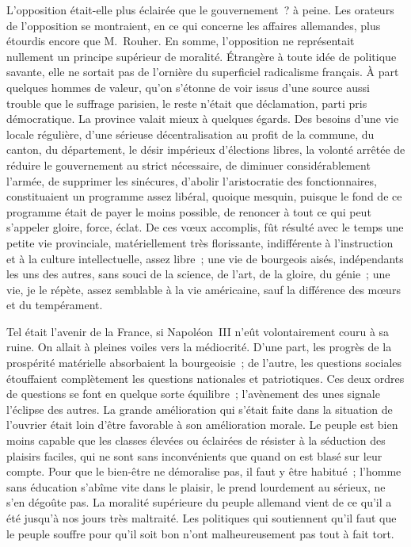 \documentclass[french,twoside]{book} %
\begin{document}
L’opposition était-elle plus éclairée que le gouvernement ? à peine. Les orateurs de l’opposition se montraient, en ce qui concerne les affaires allemandes, plus étourdis encore que M. Rouher. En somme, l’opposition ne représentait nullement un principe supérieur de moralité. Étrangère à toute idée de politique savante, elle ne sortait pas de l’ornière du superficiel radicalisme français. À part quelques hommes de valeur, qu’on s’étonne de voir issus d’une source aussi trouble que le suffrage parisien, le reste n’était que déclamation, parti pris démocratique. La province valait mieux à quelques égards. Des besoins d’une vie locale régulière, d’une sérieuse décentralisation au profit de la commune, du canton, du département, le désir impérieux d’élections libres, la volonté arrêtée de réduire le gouvernement au strict nécessaire, de diminuer considérablement l’armée, de supprimer les sinécures, d’abolir l’aristocratie des fonctionnaires, constituaient un programme assez libéral, quoique mesquin, puisque le fond de ce programme était de payer le moins possible, de renoncer à tout ce qui peut s’appeler gloire, force, éclat. De ces vœux accomplis, fût résulté avec le temps une petite vie provinciale, matériellement très florissante, indifférente à l’instruction et à la culture intellectuelle, assez libre ; une vie de bourgeois aisés, indépendants les uns des autres, sans souci de la science, de l’art, de la gloire, du génie ; une vie, je le répète, assez semblable à la vie américaine, sauf la différence des mœurs et du tempérament.\par
Tel était l’avenir de la France, si Napoléon III n’eût volontairement couru à sa ruine. On allait à pleines voiles vers la médiocrité. D’une part, les progrès de la prospérité matérielle absorbaient la bourgeoisie ; de l’autre, les questions sociales étouffaient complètement les questions nationales et patriotiques. Ces deux ordres de questions se font en quelque sorte équilibre ; l’avènement des unes signale l’éclipse des autres. La grande amélioration qui s’était faite dans la situation de l’ouvrier était loin d’être favorable à son amélioration morale. Le peuple est bien moins capable que les classes élevées ou éclairées de résister à la séduction des plaisirs faciles, qui ne sont sans inconvénients que quand on est blasé sur leur compte. Pour que le bien-être ne démoralise pas, il faut y être habitué ; l’homme sans éducation s’abîme vite dans le plaisir, le prend lourdement au sérieux, ne s’en dégoûte pas. La moralité supérieure du peuple allemand vient de ce qu’il a été jusqu’à nos jours très maltraité. Les politiques qui soutiennent qu’il faut que le peuple souffre pour qu’il soit bon n’ont malheureusement pas tout à fait tort.\par
\end{document}
